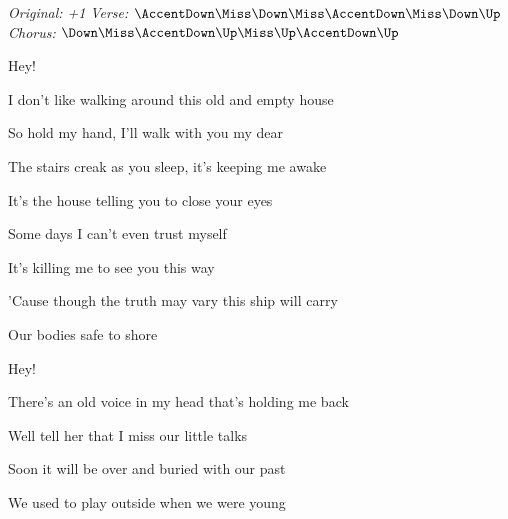 \begin{song}


\begin{headerbox}
\RaiseBoxWithAccents
\textit{Original: +1} \quad
\textit{Verse:} $\AccentDown\Miss\Down\Miss\AccentDown\Miss\Down\Up$ \quad
\textit{Chorus:} $\Down\Miss\AccentDown\Up\Miss\Up\AccentDown\Up$
\end{headerbox}

\begin{vchordbox}
\end{vchordbox}

\large

\bigskip

\Intro {}   Hey!  \par

\bigskip

 \par
{}I don't like walking around this old and empty house \par
So hold my hand, I'll walk with you my dear \par
The stairs creak as you sleep, it's keeping me awake \par
It's the house telling you to close your eyes \par

\bigskip

Some days I can't even  trust myself \par
It's killing me to see you this way \par
'Cause though the truth may vary this  ship will carry \par
{} \par
Our bodies safe to shore  \par

\bigskip

   Hey!  \par

\bigskip

There's an old voice in my head that's  holding me back \par
Well tell her that I miss our little talks \par
{}Soon it will be over and buried with our past \par
We used to play outside when we were young \par
{} \par


\end{song}
